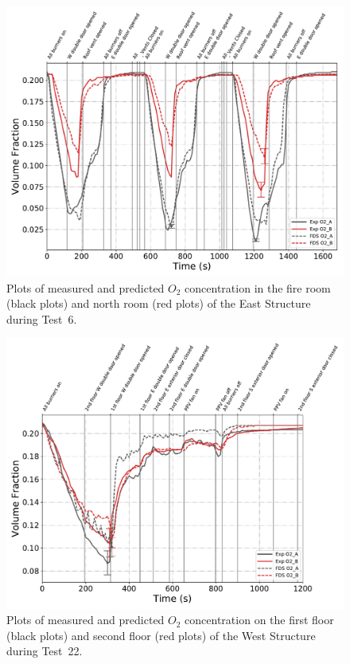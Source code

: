 \begin{figure}[!h]
	\centering
	\includegraphics[width=\columnwidth]{Figures/Plots/Validation/Gas_Concentration/Test_6_O2}
	\caption[Plots of measured and predicted $O_2$ concentration during Test~6.]{Plots of measured and predicted $O_2$ concentration in the fire room (black plots) and north room (red plots) of the East Structure during Test~6.}
	\label{fig:Test6_O2}
\end{figure}

\begin{figure}[!h]
	\centering
	\includegraphics[width=\columnwidth]{Figures/Plots/Validation/Gas_Concentration/Test_22_O2}
	\caption[Plots of measured and predicted $O_2$ concentration during Test~22.]{Plots of measured and predicted $O_2$ concentration on the first floor (black plots) and second floor (red plots) of the West Structure during Test~22.}
	\label{fig:Test22_O2}
\end{figure}


